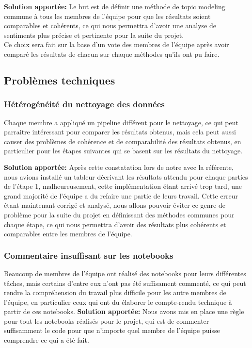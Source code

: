\documentclass[12pt,a4paper]{article}
\begin{document}
\hspace{0.5cm}\textbf{Solution apportée:} Le but est de définir une méthode de topic modeling commune à tous les membres 
de l'équipe pour que les résultats soient comparables et cohérents, ce qui nous permettra d'avoir une analyse 
de sentiments plus précise et pertinente pour la suite du projet.\\
Ce choix sera fait sur la base d'un vote des membres de l'équipe après avoir comparé les résultats de chacun sur chaque méthodes qu'ils ont pu faire.

\pagebreak
\subsection{Problèmes techniques}
\subsubsection{Hétérogénéité du nettoyage des données}
Chaque membre a appliqué un pipeline différent pour le nettoyage, ce qui peut parraitre intéressant
pour comparer les résultats obtenus, mais cela peut aussi causer des problèmes de cohérence et de comparabilité
des résultats obtenus, en particulier pour les étapes suivantes qui se basent sur les résultats du nettoyage. \smallbreak

\hspace{0.5cm}\textbf{Solution apportée:} Après cette constatation lors de notre 
 avec la référente, nous avions installé un tableur décrivant les 
résultats attendu pour chaque parties de l'étape 1, malheureusement, cette implémentation étant 
arrivé trop tard, une grand majorité de l'équipe a du refaire une partie de leurs travail.
Cette erreur étant maintenant corrigé et analysé, nous allons pouvoir éviter ce genre de problème
pour la suite du projet en définissant des méthodes communes pour chaque étape,
ce qui nous permettra d'avoir des résultats plus cohérents et comparables entre les membres de l'équipe.
\subsubsection{Commentaire insuffisant sur les notebooks}
Beaucoup de membres de l'équipe ont réalisé des notebooks pour leurs différentes tâches, mais certains d'entre eux
n'ont pas été suffisament commenté, ce qui peut rendre la compréhension du travail plus difficile
pour les autre membres de l'équipe, en particulier ceux qui ont du élaborer le compte-rendu technique à partir de ces notebooks. \smallbreak
\hspace{0.5cm}\textbf{Solution apportée:} Nous avons mis en place une règle pour tout les notebooks réalisés pour le projet, 
qui est de commenter suffisamment le code pour que n'importe quel membre de l'équipe puisse comprendre ce qui a été fait.
\end{document}
